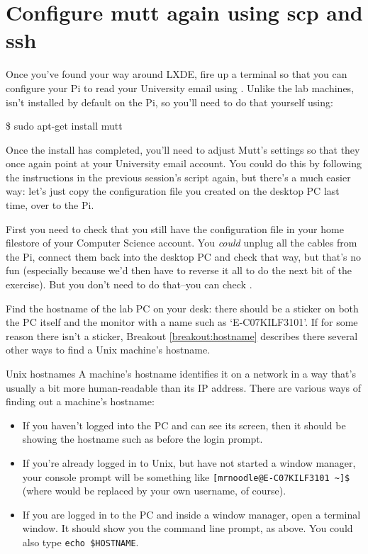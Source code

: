 \section{Configure mutt again using scp and ssh}

Once you've found your way around LXDE, fire up a terminal so that you can configure your Pi to read your University email using . Unlike the lab machines,  isn't installed by default on the Pi, so you'll need to do that yourself using:

\begin{ttoutenv}
\$ sudo apt-get install mutt
\end{ttoutenv}

Once the install has completed, you'll need to adjust Mutt's settings so that they once again point at your University email account. You could do this by following the instructions in the previous session's script again, but there's a much easier way: let's just copy the configuration file you created on the desktop PC last time, over to the Pi. 

First you need to check that you still have the  configuration file in your home filestore of your Computer Science account. You \textit{could} unplug all the cables from the Pi, connect them back into the desktop PC and check that way, but that's no fun (especially because we'd then have to reverse it all to do the next bit of the exercise). But you don't need to do that--you can check . 

Find the hostname of the lab PC on your desk: there should be a sticker on both the PC itself and the monitor with a name such as `E-C07KILF3101'. If for some reason there isn't a sticker, Breakout \ref{breakout:hostname} describes there several other ways to find a Unix machine's hostname. 


\begin{linux}{Unix hostnames}
\label{breakout:hostname}
A machine's hostname identifies it on a network in a way that's usually a bit more human-readable than its IP address. There are various ways of finding out a machine's hostname:

\begin{itemize}
\item If you haven't logged into the PC and can see its screen, then it should be showing the hostname such as  before the login prompt. 
\item If you're already logged in to Unix, but have not started a window manager, your console prompt will be something like  \verb|[mrnoodle@E-C07KILF3101 ~]$| (where  would be replaced by your own username, of course).
\item If you are logged in to the PC and inside a window manager, open a terminal window. It should show you the command line prompt, as above. You could also type \verb|echo $HOSTNAME|.
\end{itemize}
\end{linux}

